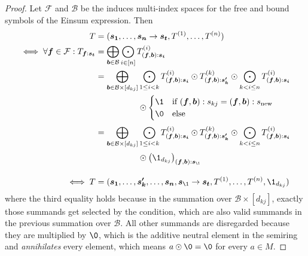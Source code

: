 \begin{proof}
    \small
    Let $\mathcal{F}$ and $\mathcal{B}$ be the induces multi-index spaces for the free and bound symbols of the Einsum expression.
    Then
    \begin{align*}
        T                                                        & = (\bm{s_1}, \dots, \bm{s_n} \rightarrow \bm{s_t}, T^{(1)}, \dots, T^{(n)})                                                                                                                                                                             \\
        \iff \forall \bm{f} \in \mathcal{F}: T_{\bm{f}:\bm{s_t}} & = \bigoplus\limits_{\bm{b} \in \mathcal{B}} \bigodot\limits_{i \in [n]} T^{(i)}_{(\bm{f}, \bm{b}):\bm{s_i}}                                                                                                                                         \\
                                                                 & = \bigoplus\limits_{\bm{b} \in \mathcal{B} \times [d_{kj}]} \bigodot\limits_{1 \leq i < k} T^{(i)}_{(\bm{f}, \bm{b}):\bm{s_i}} \odot T^{(k)}_{(\bm{f}, \bm{b}):\bm{s'_k}} \odot \bigodot\limits_{k < i \leq n} T^{(i)}_{(\bm{f}, \bm{b}):\bm{s_i}} \\
                                                                 & \phantom{{}=\bigoplus\limits_{\bm{b} \in \mathcal{B} \times [d_{kj}]}} \odot \begin{cases}
            \1 & \text{if $(\bm{f}, \bm{b}): s_{kj} = (\bm{f}, \bm{b}): s_{\text{new}}$} \\
            \0 & \text{else}
        \end{cases}                                                                                                                                             \\
                                                                 & = \bigoplus\limits_{\bm{b} \in \mathcal{B} \times [d_{kj}]} \bigodot\limits_{1 \leq i < k} T^{(i)}_{(\bm{f}, \bm{b}):\bm{s_i}} \odot T^{(k)}_{(\bm{f}, \bm{b}):\bm{s'_k}} \odot \bigodot\limits_{k < i \leq n} T^{(i)}_{(\bm{f}, \bm{b}):\bm{s_i}} \\
                                                                 & \phantom{{}=\bigoplus\limits_{\bm{b} \in \mathcal{B} \times [d_{kj}]}} \odot \left(\1_{d_{kj}}\right)_{(\bm{f}, \bm{b}):\bm{s_\1}}                                                                                                                 \\
        \iff T                                                   & = (\bm{s_1}, \dots, \bm{s'_k}, \dots, \bm{s_n}, \bm{s_\1} \rightarrow \bm{s_t}, T^{(1)}, \dots, T^{(n)}, \1_{d_{kj}})
    \end{align*}
    where the third equality holds because in the summation over $\mathcal{B} \times [d_{kj}]$, exactly those summands get selected by the condition, which are also valid summands in the previous summation over $\mathcal{B}$.
    All other summands are disregarded because they are multiplied by $\0$, which is the additive neutral element in the semiring and \textit{annihilates} every element, which means $a \odot \0 = \0$ for every $a \in M$.
\end{proof}
\bigskip